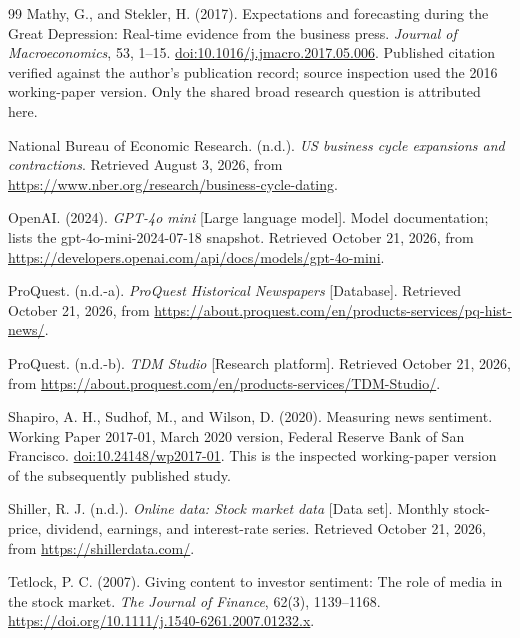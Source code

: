 \begin{thebibliography}{99}
Mathy, G., and Stekler, H. (2017).
Expectations and forecasting during the Great Depression: Real-time evidence from the business press.
\textit{Journal of Macroeconomics}, 53, 1--15.
\href{https://doi.org/10.1016/j.jmacro.2017.05.006}{doi:10.1016/j.jmacro.2017.05.006}.
Published citation verified against the author's publication record; source inspection used the 2016 working-paper version. Only the shared broad research question is attributed here.

National Bureau of Economic Research. (n.d.). \textit{US business cycle expansions and contractions}. Retrieved August 3, 2026, from
\url{https://www.nber.org/research/business-cycle-dating}.

OpenAI. (2024). \textit{GPT-4o mini} [Large language model]. Model documentation; lists the gpt-4o-mini-2024-07-18 snapshot. Retrieved October 21, 2026, from
\url{https://developers.openai.com/api/docs/models/gpt-4o-mini}.

ProQuest. (n.d.-a). \textit{ProQuest Historical Newspapers} [Database]. Retrieved October 21, 2026, from
\url{https://about.proquest.com/en/products-services/pq-hist-news/}.

ProQuest. (n.d.-b). \textit{TDM Studio} [Research platform]. Retrieved October 21, 2026, from
\url{https://about.proquest.com/en/products-services/TDM-Studio/}.

Shapiro, A. H., Sudhof, M., and Wilson, D. (2020).
Measuring news sentiment. Working Paper 2017-01, March 2020 version, Federal Reserve Bank of San Francisco.
\href{https://doi.org/10.24148/wp2017-01}{doi:10.24148/wp2017-01}.
This is the inspected working-paper version of the subsequently published study.

Shiller, R. J. (n.d.). \textit{Online data: Stock market data} [Data set]. Monthly stock-price, dividend, earnings, and interest-rate series. Retrieved October 21, 2026, from
\url{https://shillerdata.com/}.

Tetlock, P. C. (2007). Giving content to investor sentiment: The role of media in the stock market. \textit{The Journal of Finance}, 62(3), 1139--1168.
\url{https://doi.org/10.1111/j.1540-6261.2007.01232.x}.
\end{thebibliography}
\endgroup
